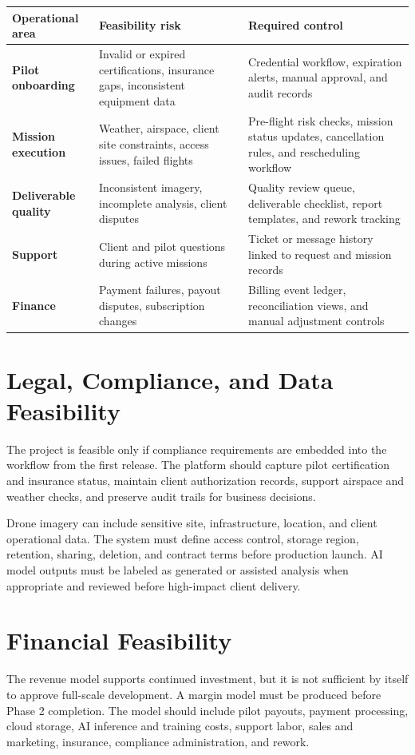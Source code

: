 \documentclass[11pt,a4paper]{article}
\begin{document}
\begin{longtable}{>{\bfseries}p{}p{}p{}}
\toprule
Operational area & Feasibility risk & Required control \\
\midrule
Pilot onboarding & Invalid or expired certifications, insurance gaps, inconsistent equipment data & Credential workflow, expiration alerts, manual approval, and audit records \\
Mission execution & Weather, airspace, client site constraints, access issues, failed flights & Pre-flight risk checks, mission status updates, cancellation rules, and rescheduling workflow \\
Deliverable quality & Inconsistent imagery, incomplete analysis, client disputes & Quality review queue, deliverable checklist, report templates, and rework tracking \\
Support & Client and pilot questions during active missions & Ticket or message history linked to request and mission records \\
Finance & Payment failures, payout disputes, subscription changes & Billing event ledger, reconciliation views, and manual adjustment controls \\
\bottomrule
\end{longtable}

\section{Legal, Compliance, and Data Feasibility}

The project is feasible only if compliance requirements are embedded into the workflow from the first release. The platform should capture pilot certification and insurance status, maintain client authorization records, support airspace and weather checks, and preserve audit trails for business decisions.

Drone imagery can include sensitive site, infrastructure, location, and client operational data. The system must define access control, storage region, retention, sharing, deletion, and contract terms before production launch. AI model outputs must be labeled as generated or assisted analysis when appropriate and reviewed before high-impact client delivery.

\section{Financial Feasibility}

The revenue model supports continued investment, but it is not sufficient by itself to approve full-scale development. A margin model must be produced before Phase 2 completion. The model should include pilot payouts, payment processing, cloud storage, AI inference and training costs, support labor, sales and marketing, insurance, compliance administration, and rework.
\end{document}
